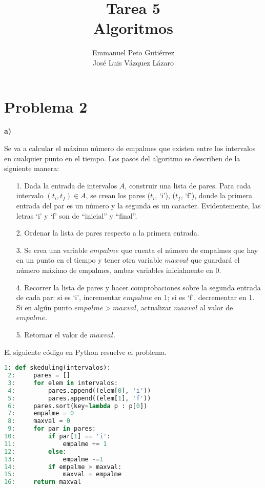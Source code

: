 \documentclass{article}
\title{Tarea 5\\Algoritmos}
\author{Emmanuel Peto Gutiérrez\\José Luis Vázquez Lázaro}
\begin{document}
\maketitle

\section*{Problema 2}

\textbf{a)}

Se va a calcular el máximo número de empalmes que existen entre los intervalos en cualquier punto en el tiempo. Los pasos del algoritmo se describen de la siguiente manera:

\begin{itemize}
\item[1.] Dada la entrada de intervalos $A$, construir una lista de pares. Para cada intervalo $(t_i, t_f) \in A$, se crean los pares ($t_i$, `i'), ($t_f$, `f'), donde la primera entrada del par es un número y la segunda es un caracter. Evidentemente, las letras `i' y `f' son de ``inicial'' y ``final''.
\item[2.] Ordenar la lista de pares respecto a la primera entrada.
\item[3.] Se crea una variable $empalme$ que cuenta el número de empalmes que hay en un punto en el tiempo y tener otra variable $maxval$ que guardará el número máximo de empalmes, ambas variables inicialmente en 0.
\item[4.] Recorrer la lista de pares y hacer comprobaciones sobre la segunda entrada de cada par: si es `i', incrementar $empalme$ en 1; si es `f', decrementar en 1. Si en algún punto $empalme > maxval$, actualizar $maxval$ al valor de $empalme$.
\item[5.] Retornar el valor de $maxval$.
\end{itemize}

El siguiente código en Python resuelve el problema.

\begin{lstlisting}[language=Python]
 1: def skeduling(intervalos):
 2:     pares = []
 3:     for elem in intervalos:
 4:         pares.append((elem[0], 'i'))
 5:         pares.append((elem[1], 'f'))
 6:     pares.sort(key=lambda p : p[0])
 7:     empalme = 0
 8:     maxval = 0
 9:     for par in pares:
10:         if par[1] == 'i':
11:             empalme += 1
12:         else:
13:             empalme -=1
14:         if empalme > maxval:
15:             maxval = empalme
16:     return maxval
\end{lstlisting}
\end{document}
